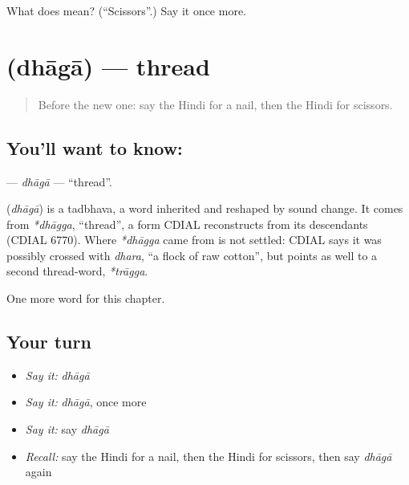 \begin{tcolorbox}[breakable,colback=teal!4,colframe=teal!35!black,title={Before you move on}]
What does  mean? (\textquotedblleft{}Scissors\textquotedblright{}.) Say it once more.
\end{tcolorbox}
\section[\texorpdfstring{\hi{धागा} (dhāgā)}{धागा (dhāgā)}]{ (dhāgā) — thread}

\label{lesson:HI-C130-dhaga}



\begin{quote}
Before the new one: say the Hindi for a nail, then the Hindi for scissors.
\end{quote}

\subsection*{You'll want to know: }
\textbf{} — \emph{dhāgā} — \textquotedblleft{}thread\textquotedblright{}.

\begin{cousinweb}
\textbf{} (\emph{dhāgā}) is a tadbhava, a word inherited and reshaped by sound change. It comes from \emph{*dhāgga}, \textquotedblleft{}thread\textquotedblright{}, a form CDIAL reconstructs from its descendants (CDIAL 6770). Where \emph{*dhāgga} came from is not settled: CDIAL says it was possibly crossed with \emph{dhara}, \textquotedblleft{}a flock of raw cotton\textquotedblright{}, but points as well to a second thread-word, \emph{*trāgga}.
\end{cousinweb}

\begin{grammarlens}[title={What you've built}]
One more word for this chapter.
\end{grammarlens}

\subsection*{Your turn}
\begin{itemize}
\raggedright
  \item \emph{Say it:} \emph{dhāgā}
  \item \emph{Say it:} \emph{dhāgā}, once more
  \item \emph{Say it:} say \emph{dhāgā}
  \item \emph{Recall:} say the Hindi for a nail, then the Hindi for scissors, then say \emph{dhāgā} again
\end{itemize}

